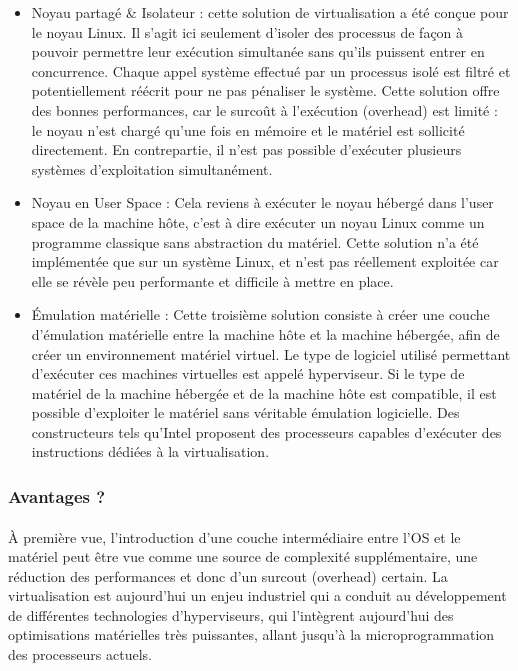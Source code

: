 \begin{itemize}
\item Noyau partagé \& Isolateur : cette solution de virtualisation a été conçue
pour le noyau Linux. Il s'agit ici seulement d'isoler des processus de façon à
pouvoir permettre leur exécution simultanée sans qu'ils puissent entrer en
concurrence. Chaque appel système effectué par un processus isolé est filtré et
potentiellement réécrit pour ne pas pénaliser le système. Cette solution offre
des bonnes performances, car le surcoût à l'exécution (overhead) est limité : le
noyau n'est chargé qu'une fois en mémoire et le matériel est sollicité
directement. En contrepartie, il n'est pas possible d'exécuter plusieurs
systèmes d'exploitation simultanément.
\item Noyau en User Space : Cela reviens à exécuter le noyau hébergé dans l'user
space de la machine hôte, c'est à dire exécuter un noyau Linux comme un
programme classique sans abstraction du matériel. Cette solution n'a été
implémentée que sur un système Linux, et n'est pas réellement exploitée car elle
se révèle peu performante et difficile à mettre en place.
\item Émulation matérielle : Cette troisième solution consiste à créer une
couche d'émulation matérielle entre la machine hôte et la machine hébergée, afin
de créer un environnement matériel virtuel. Le type de logiciel utilisé
permettant d'exécuter ces machines virtuelles est appelé hyperviseur. Si le type
de matériel de la machine hébergée et de la machine hôte est compatible, il est
possible d'exploiter le matériel sans véritable émulation logicielle. Des
constructeurs tels qu'Intel proposent des processeurs capables d'exécuter des
instructions dédiées à la virtualisation.
\end{itemize}

\subsubsection{Avantages ?}


\paragraph{} À première vue, l'introduction d'une couche intermédiaire entre
l'OS et le matériel peut être vue comme une source de complexité supplémentaire,
une réduction des performances et donc d'un surcout (overhead) certain.
La virtualisation est aujourd'hui un enjeu industriel qui a conduit au
développement de différentes technologies d'hyperviseurs, qui l'intègrent
aujourd'hui des optimisations matérielles très puissantes, allant jusqu'à la
microprogrammation des processeurs actuels.

